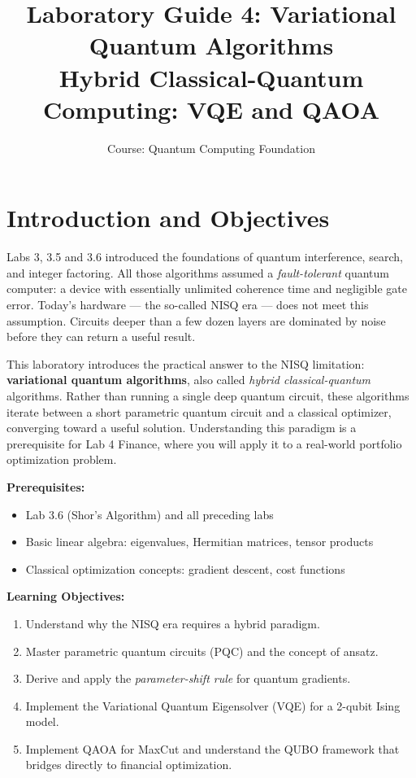 \documentclass[a4paper,11pt]{article}
\title{\textbf{Laboratory Guide 4: Variational Quantum Algorithms}\\
\large Hybrid Classical-Quantum Computing: VQE and QAOA}
\author{Course: Quantum Computing Foundation}
\date{}
\begin{document}
\maketitle
\tableofcontents
\newpage

\section{Introduction and Objectives}

Labs 3, 3.5 and 3.6 introduced the foundations of quantum interference, search,
and integer factoring. All those algorithms assumed a \emph{fault-tolerant}
quantum computer: a device with essentially unlimited coherence time and
negligible gate error. Today's hardware — the so-called NISQ era — does not
meet this assumption. Circuits deeper than a few dozen layers are dominated by
noise before they can return a useful result.

This laboratory introduces the practical answer to the NISQ limitation:
\textbf{variational quantum algorithms}, also called \emph{hybrid
classical-quantum} algorithms. Rather than running a single deep quantum
circuit, these algorithms iterate between a short parametric quantum circuit
and a classical optimizer, converging toward a useful solution.
Understanding this paradigm is a prerequisite for Lab 4 Finance, where you will apply
it to a real-world portfolio optimization problem.

\vspace{0.3cm}
\noindent\textbf{Prerequisites:}
\begin{itemize}
    \item Lab 3.6 (Shor's Algorithm) and all preceding labs
    \item Basic linear algebra: eigenvalues, Hermitian matrices, tensor products
    \item Classical optimization concepts: gradient descent, cost functions
\end{itemize}

\noindent\textbf{Learning Objectives:}
\begin{enumerate}
    \item Understand why the NISQ era requires a hybrid paradigm.
    \item Master parametric quantum circuits (PQC) and the concept of ansatz.
    \item Derive and apply the \emph{parameter-shift rule} for quantum gradients.
    \item Implement the Variational Quantum Eigensolver (VQE) for a 2-qubit
          Ising model.
    \item Implement QAOA for MaxCut and understand the QUBO framework that
          bridges directly to financial optimization.
\end{enumerate}
\end{document}
